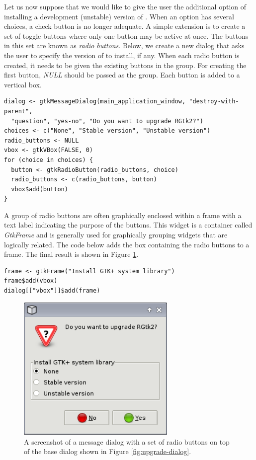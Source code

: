 \documentclass[article]{jss}
\begin{document}
Let us now suppose that we would like to give the user the additional option of
installing a development (unstable) version of .
When an option has several choices, a check button is no longer adequate. A
simple extension is to create a set of toggle buttons where only one button
may be active at once. The buttons in this set are known as \emph{radio buttons}.
Below, we create a new dialog that asks the user to specify the version of 
to install, if any. When each radio button is created, it needs to be given the existing buttons
in the group. For creating the first button, \emph{NULL} should be passed as the group.
Each button is added to a vertical box. 
\begin{verbatim}
dialog <- gtkMessageDialog(main_application_window, "destroy-with-parent", 
  "question", "yes-no", "Do you want to upgrade RGtk2?")
choices <- c("None", "Stable version", "Unstable version")
radio_buttons <- NULL
vbox <- gtkVBox(FALSE, 0)
for (choice in choices) {
  button <- gtkRadioButton(radio_buttons, choice)
  radio_buttons <- c(radio_buttons, button)
  vbox$add(button)
}
\end{verbatim}
A group of radio buttons are often graphically enclosed within a frame with
a text label indicating the purpose of the buttons. This widget is a container 
called \emph{GtkFrame} and is generally used for graphically grouping widgets that are
logically related. The code below adds the box containing the radio buttons
to a frame. The final result is shown in Figure \ref{fig:radio-dialog}.
\begin{verbatim}
frame <- gtkFrame("Install GTK+ system library")
frame$add(vbox)
dialog[["vbox"]]$add(frame)
\end{verbatim}

\begin{figure}
\begin{center}
\includegraphics[width=3in]{radio-dialog.png}
\caption{\label{fig:radio-dialog}A screenshot of a message dialog with a set of
radio buttons on top of the base dialog shown in Figure \ref{fig:upgrade-dialog}.}
\end{center}
\end{figure}
\end{document}
